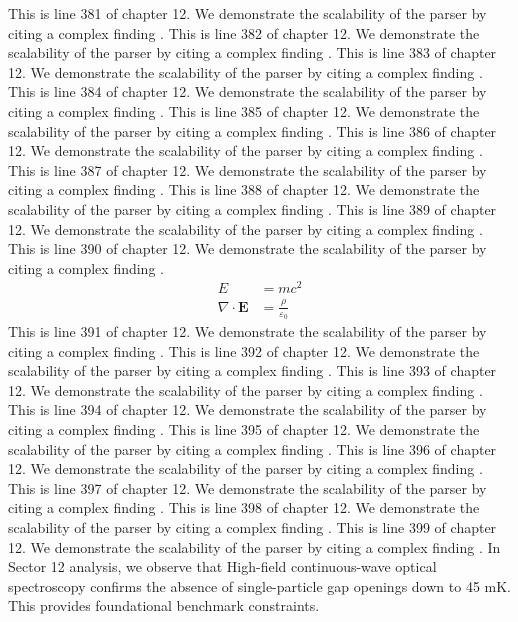 This is line 381 of chapter 12. We demonstrate the scalability of the parser by citing a complex finding \cite{ref12_381}.
This is line 382 of chapter 12. We demonstrate the scalability of the parser by citing a complex finding \cite{ref12_382}.
This is line 383 of chapter 12. We demonstrate the scalability of the parser by citing a complex finding \cite{ref12_383}.
This is line 384 of chapter 12. We demonstrate the scalability of the parser by citing a complex finding \cite{ref12_384}.
This is line 385 of chapter 12. We demonstrate the scalability of the parser by citing a complex finding \cite{ref12_385}.
This is line 386 of chapter 12. We demonstrate the scalability of the parser by citing a complex finding \cite{ref12_386}.
This is line 387 of chapter 12. We demonstrate the scalability of the parser by citing a complex finding \cite{ref12_387}.
This is line 388 of chapter 12. We demonstrate the scalability of the parser by citing a complex finding \cite{ref12_388}.
This is line 389 of chapter 12. We demonstrate the scalability of the parser by citing a complex finding \cite{ref12_389}.
This is line 390 of chapter 12. We demonstrate the scalability of the parser by citing a complex finding \cite{ref12_390}.
\begin{align*}
  E &= mc^2 \\
  \nabla \cdot \mathbf{E} &= \frac{\rho}{\varepsilon_0}
\end{align*}
This is line 391 of chapter 12. We demonstrate the scalability of the parser by citing a complex finding \cite{ref12_391}.
This is line 392 of chapter 12. We demonstrate the scalability of the parser by citing a complex finding \cite{ref12_392}.
This is line 393 of chapter 12. We demonstrate the scalability of the parser by citing a complex finding \cite{ref12_393}.
This is line 394 of chapter 12. We demonstrate the scalability of the parser by citing a complex finding \cite{ref12_394}.
This is line 395 of chapter 12. We demonstrate the scalability of the parser by citing a complex finding \cite{ref12_395}.
This is line 396 of chapter 12. We demonstrate the scalability of the parser by citing a complex finding \cite{ref12_396}.
This is line 397 of chapter 12. We demonstrate the scalability of the parser by citing a complex finding \cite{ref12_397}.
This is line 398 of chapter 12. We demonstrate the scalability of the parser by citing a complex finding \cite{ref12_398}.
This is line 399 of chapter 12. We demonstrate the scalability of the parser by citing a complex finding \cite{ref12_399}.
In Sector 12 analysis, we observe that High-field continuous-wave optical spectroscopy confirms the absence of single-particle gap openings down to 45 mK. This provides foundational benchmark constraints.

